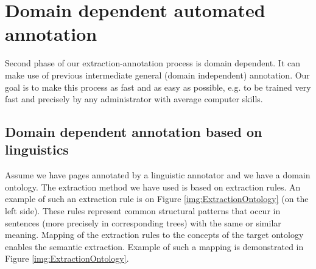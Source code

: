 \documentclass{sig-alternate}
\begin{document}
\section{Domain dependent automated annotation}
Second phase of our extraction-annotation process is domain dependent. It can make use of previous intermediate general (domain independent) annotation. Our goal is to make this process as fast and as easy as possible, e.g. to be trained very fast and precisely by any administrator with average computer skills.



 
\subsection{Domain dependent annotation based on linguistics}

Assume we have pages annotated by a linguistic annotator and we have a domain ontology. The extraction method we have used is based on extraction rules. An example of such an extraction rule is on Figure \ref{img:ExtractionOntology} (on the left side). These rules represent common structural patterns that occur in sentences (more precisely in corresponding trees) with the same or similar meaning. Mapping of the extraction rules to the concepts of the target ontology enables the semantic extraction. Example of such a mapping is demonstrated in Figure \ref{img:ExtractionOntology}.
\end{document}
